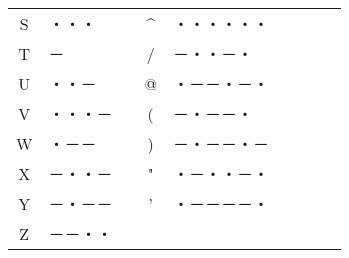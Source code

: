 \documentclass[a4paper,10.5pt]{ltjsarticle}
\begin{document}
\begin{table}[h]
{\begin{tabular}{|c|l|c|c|l|c|c|c|c|}
            S & ・・・ &  & \textasciicircum & ・・・・・・ &  &  &  \\
            T & － &  & / & －・・－・ &  &  &  \\
            U & ・・－ &  & @ & ・－－・－・ &  &  &  \\
            V & ・・・－ &  & ( & －・－－・ &  &  &  \\
            W & ・－－ &  & ) & －・－－・－ &  &  &  \\
            X & －・・－ &  & "  & ・－・・－・ &  &  &  \\
            Y & －・－－ &  & ' & ・－－－－・ &  &  &  \\
            Z & －－・・ &  &  &  &  &  &  \\
            \hline
        \end{tabular}
    }
\end{table}
\end{document}
